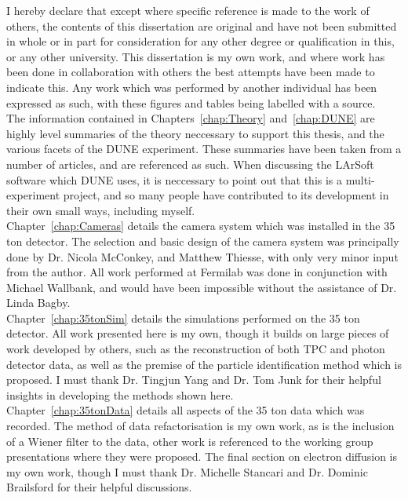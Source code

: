 
\begin{declaration}

  I hereby declare that except where specific reference is made to the work of others, the contents of this dissertation are original and have not been submitted in whole or in part for consideration for any other degree or qualification in this, or any other university. This dissertation is my own work, and where work has been done in collaboration with others the best attempts have been made to indicate this. Any work which was performed by another individual has been expressed as such, with these figures and tables being labelled with a source. \\

  The information contained in Chapters~\ref{chap:Theory} and~\ref{chap:DUNE} are highly level summaries of the theory neccessary to support this thesis, and the various facets of the DUNE experiment. These summaries have been taken from a number of articles, and are referenced as such. When discussing the LArSoft software which DUNE uses, it is neccessary to point out that this is a multi-experiment project, and so many people have contributed to its development in their own small ways, including myself. \\

  Chapter~\ref{chap:Cameras} details the camera system which was installed in the 35 ton detector. The selection and basic design of the camera system was principally done by Dr. Nicola McConkey, and Matthew Thiesse, with only very minor input from the author. All work performed at Fermilab was done in conjunction with Michael Wallbank, and would have been impossible without the assistance of Dr. Linda Bagby. \\

  Chapter~\ref{chap:35tonSim} details the simulations performed on the 35 ton detector. All work presented here is my own, though it builds on large pieces of work developed by others, such as the reconstruction of both TPC and photon detector data, as well as the premise of the particle identification method which is proposed. I must thank Dr. Tingjun Yang and Dr. Tom Junk for their helpful insights in developing the methods shown here. \\

  Chapter~\ref{chap:35tonData} details all aspects of the 35 ton data which was recorded. The method of data refactorisation is my own work, as is the inclusion of a Wiener filter to the data, other work is referenced to the working group presentations where they were proposed. The final section on electron diffusion is my own work, though I must thank Dr. Michelle Stancari and Dr. Dominic Brailsford for their helpful discussions. \\


\end{declaration}
